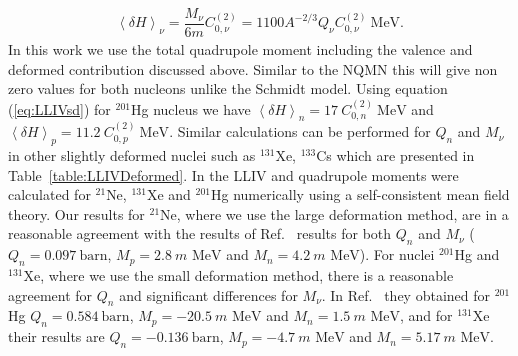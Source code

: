 \documentclass[10pt,a4paper, twoside]{report}
\begin{document}
\begin{align} \label{eq:LLIVsd}
\left<\delta H\right>_{\nu} = \dfrac{M_\nu}{6m} C_{0, \nu}^{(2)} = 1100A^{-2/3}Q_{\nu} C_{0, \nu}^{(2)} \ \text{MeV}.
\end{align}
In this work we use the total quadrupole moment including the valence and deformed contribution discussed above. Similar to the NQMN this will give non zero values for both nucleons unlike the Schmidt model. Using equation (\ref{eq:LLIVsd}) for $^{201}$Hg nucleus we have $\left<\delta H\right>_{n} = 17 \ C_{0, n}^{(2)} \ \text{MeV}$ and $\left<\delta H\right>_{p} = 11.2 \ C_{0, p}^{(2)} \ \text{MeV}$. Similar calculations can be performed for $Q_n$ and $M_{\nu}$ in other slightly deformed nuclei such as $^{131}$Xe, $^{133}$Cs which are presented in Table~\ref{table:LLIVDeformed}. In \cite{Brown2016} the LLIV and quadrupole moments were calculated for $^{21}$Ne, $^{131}$Xe and $^{201}$Hg numerically using a self-consistent mean field theory. 
Our results for $^{21}$Ne, where we  use the large deformation method, are in a reasonable agreement  with the results of Ref.~\cite{Brown2016} results for both $Q_{n}$ and $M_{\nu}$ ($Q_n = 0.097 \ \text{barn}$, $M_{p} = 2.8 \ m\text{ MeV}$ and $M_n = 4.2 \ m\text{ MeV}$). For nuclei  $^{201}$Hg  and $^{131}$Xe, where we use the small deformation method, there is a reasonable agreement for $Q_n$ and significant differences for $M_{\nu}$. In Ref.~\cite{Brown2016}  they obtained for $^{201}$Hg  $Q_n = 0.584 \ \text{barn}$, $M_{p} = -20.5 \ m\text{ MeV}$ and $M_n = 1.5 \ m\text{ MeV}$,  and for $^{131}$Xe their results are $Q_n = -0.136 \ \text{barn}$, $M_{p} = -4.7 \ m\text{ MeV}$ and $M_n = 5.17 \ m\text{ MeV}$.
\end{document}
